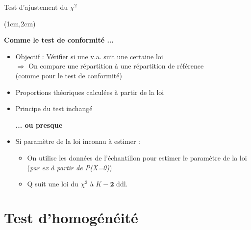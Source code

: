 \documentclass{beamer}
\begin{document}
\begin{frame}{Test d'ajustement du $\chi^2$}
\begin{textblock*}{\textwidth}(1cm,2cm)

\begin{center}{\bf \Large Comme le test de conformité ...} \end{center}

\begin{itemize}
\item Objectif : Vérifier si une v.a. suit une certaine loi \\
$\Rightarrow$ On compare une répartition à une répartition de référence \\
(comme pour le test de conformité)

\item Proportions théoriques calculées à partir de la loi

\item Principe du test inchangé\\

\begin{center}{\bf \Large ... ou presque} \end{center}

\item Si paramètre de la loi inconnu à estimer : \\
\begin{itemize}
\item On utilise les données de l'échantillon pour estimer le paramètre de la loi ({\it par ex à partir de P(X=0)})
\item Q suit une loi du $\chi^2$ à $K-\mathbf{2}$ ddl. 
\end{itemize}
\end{itemize}

\end{textblock*}

\end{frame}

\section{Test d'homogénéité} 
\end{document}
